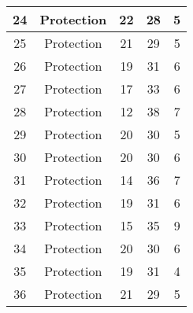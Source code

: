 \documentclass[results.tex]{subfiles}
\begin{document}
\begin{center}
\begin{tabular}{| c || c | c | c | c |}
            \hline
            24                      & Protection                   & 22                     & 28                      & 5                    \\
            \hline
            25                      & Protection                   & 21                     & 29                      & 5                    \\
            \hline
            26                      & Protection                   & 19                     & 31                      & 6                    \\
            \hline
            27                      & Protection                   & 17                     & 33                      & 6                    \\
            \hline
            28                      & Protection                   & 12                     & 38                      & 7                    \\
            \hline
            29                      & Protection                   & 20                     & 30                      & 5                    \\
            \hline
            30                      & Protection                   & 20                     & 30                      & 6                    \\
            \hline
            31                      & Protection                   & 14                     & 36                      & 7                    \\
            \hline
            32                      & Protection                   & 19                     & 31                      & 6                    \\
            \hline
            33                      & Protection                   & 15                     & 35                      & 9                    \\
            \hline
            34                      & Protection                   & 20                     & 30                      & 6                    \\
            \hline
            35                      & Protection                   & 19                     & 31                      & 4                    \\
            \hline
            36                      & Protection                   & 21                     & 29                      & 5                    \\

\end{tabular}
\end{center}
\end{document}
